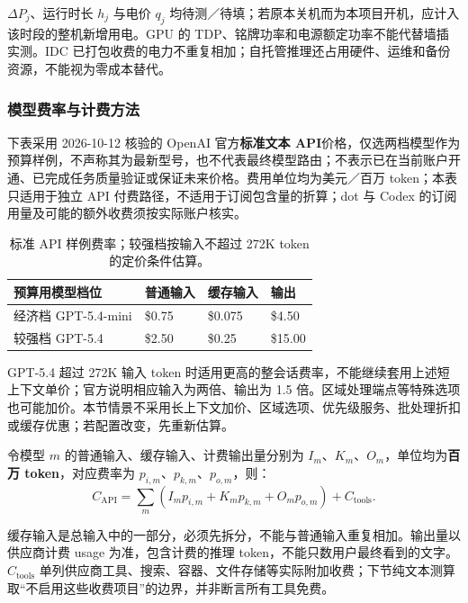 \documentclass[11pt,a4paper]{article}
\begin{document}
$\Delta P_j$、运行时长 $h_j$ 与电价 $q_j$ 均待测／待填；若原本关机而为本项目开机，应计入该时段的整机新增用电。GPU 的 TDP、铭牌功率和电源额定功率不能代替墙插实测。IDC 已打包收费的电力不重复相加；自托管推理还占用硬件、运维和备份资源，不能视为零成本替代。

\subsubsection{模型费率与计费方法}

下表采用 2026-10-12 核验的 OpenAI 官方\textbf{标准文本 API}价格，仅选两档模型作为预算样例，不声称其为最新型号，也不代表最终模型路由；不表示已在当前账户开通、已完成任务质量验证或保证未来价格。费用单位均为美元／百万 token；本表只适用于独立 API 付费路径，不适用于订阅包含量的折算；dot 与 Codex 的订阅用量及可能的额外收费须按实际账户核实。\cite{budget-openai-pricing,budget-mini,budget-gpt54,budget-chatgpt-api}

\begin{table}[H]
\centering\small\renewcommand{\arraystretch}{1.2}
\begin{tabularx}{\textwidth}{P{3.5cm} L L L}
\toprule
\textbf{预算用模型档位} & \textbf{普通输入} & \textbf{缓存输入} & \textbf{输出}\\
\midrule
经济档 GPT-5.4-mini & \$0.75 & \$0.075 & \$4.50\\
较强档 GPT-5.4 & \$2.50 & \$0.25 & \$15.00\\
\bottomrule
\end{tabularx}
\caption{标准 API 样例费率；较强档按输入不超过 272K token 的定价条件估算。}
\end{table}

GPT-5.4 超过 272K 输入 token 时适用更高的整会话费率，不能继续套用上述短上下文单价；官方说明相应输入为两倍、输出为 1.5 倍。区域处理端点等特殊选项也可能加价。本节情景不采用长上下文加价、区域选项、优先级服务、批处理折扣或缓存优惠；若配置改变，先重新估算。\cite{budget-gpt54,budget-mini}

令模型 $m$ 的普通输入、缓存输入、计费输出量分别为 $I_m$、$K_m$、$O_m$，单位均为\textbf{百万 token}，对应费率为 $p_{i,m}$、$p_{k,m}$、$p_{o,m}$，则：
\[
C_{\mathrm{API}}=\sum_m
 (I_m p_{i,m}+K_m p_{k,m}+O_m p_{o,m})+C_{\mathrm{tools}}.
\]

缓存输入是总输入中的一部分，必须先拆分，不能与普通输入重复相加。输出量以供应商计费 usage 为准，包含计费的推理 token，不能只数用户最终看到的文字。\cite{budget-reasoning} $C_{\mathrm{tools}}$ 单列供应商工具、搜索、容器、文件存储等实际附加收费；下节纯文本测算取“不启用这些收费项目”的边界，并非断言所有工具免费。\cite{budget-openai-pricing}
\end{document}

